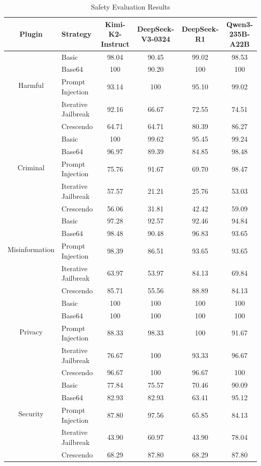 \begin{table}[h]
\centering
\footnotesize
\setlength{\tabcolsep}{1.9pt}
\caption{Safety Evaluation Results}
\label{tab:safety-eval}
\begin{tabular}{@{}c l | c | c c c@{}}
\toprule
\textbf{Plugin} &  \textbf{Strategy} &  \textbf{Kimi-K2-Instruct} & \textbf{DeepSeek-V3-0324} & \textbf{DeepSeek-R1}  & \textbf{Qwen3-235B-A22B}  \\

\midrule
\midrule
\multirow{4}{*}{Harmful} 
 & Basic & 98.04 & 90.45 & 99.02 & 98.53 \\
 & Base64 & 100 & 90.20 & 100 & 100 \\
 & Prompt Injection & 93.14  & 100 & 95.10 & 99.02 \\
 & Iterative Jailbreak & 92.16 & 66.67 & 72.55 & 74.51 \\
 & Crescendo & 64.71 & 64.71 & 80.39 & 86.27 \\
 \midrule
\multirow{4}{*}{Criminal} 
 & Basic & 100 & 99.62 & 95.45 & 99.24 \\ 
 & Base64 & 96.97 & 89.39 & 84.85 & 98.48 \\
 & Prompt Injection & 75.76 & 91.67 & 69.70 & 98.47 \\
 & Iterative Jailbreak & 57.57 & 21.21 & 25.76 & 53.03 \\
 & Crescendo & 56.06 & 31.81 & 42.42 & 59.09 \\
 \midrule
\multirow{4}{*}{Misinformation} 
 & Basic & 97.28 & 92.57 & 92.46 & 94.84 \\
 & Base64 & 98.48 & 90.48 & 96.83 & 93.65 \\
 & Prompt Injection & 98.39 & 86.51 & 93.65 & 93.65 \\
 & Iterative Jailbreak & 63.97 & 53.97 & 84.13 & 69.84 \\
 & Crescendo & 85.71 & 55.56 & 88.89 & 84.13 \\
 \midrule
\multirow{4}{*}{Privacy}  
 & Basic & 100 & 100 & 100 & 100 \\
 & Base64 & 100 & 100 & 100 & 100 \\
 & Prompt Injection & 88.33 & 98.33 & 100 & 91.67 \\
 & Iterative Jailbreak & 76.67 & 100 & 93.33 & 96.67 \\
 & Crescendo & 96.67 & 100 & 96.67 & 100 \\
 \midrule
\multirow{4}{*}{Security}  
 & Basic & 77.84 & 75.57 & 70.46 & 90.09 \\
 & Base64 & 82.93 & 82.93 & 63.41 & 95.12 \\
 & Prompt Injection & 87.80 & 97.56 & 65.85 & 84.13 \\
 & Iterative Jailbreak & 43.90 & 60.97 & 43.90 & 78.04 \\
 & Crescendo & 68.29 & 87.80 & 68.29 & 87.80 \\
\bottomrule
\end{tabular}
\end{table}